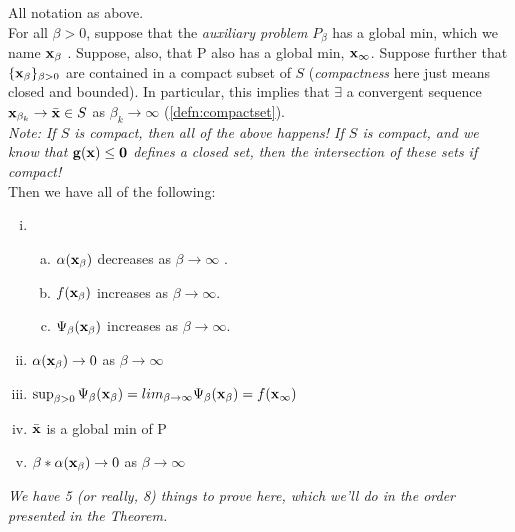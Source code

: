 \begin{theo}{}{}
	All notation as above. 
	\medskip\\
	For all $\beta > 0$, suppose that the \textit{auxiliary problem} $P_\beta$ 
	has a global min, which we name $\mathbf{x}_\beta$ . 
	Suppose, also, that
	P also has a global min, $\mathbf{x}_\infty$.
	Suppose further that $\{\mathbf{x}_\beta\}_{\beta > 0}$ are contained in a compact subset of
	$S$ (\textit{compactness} here just means closed and bounded).
	In particular, this implies that $\exists$ a convergent sequence 
	$\mathbf{x}_{\beta_k} \rightarrow \bar{\mathbf{x}} \in S$ as $\beta_k \rightarrow \infty$
	(\cref{defn:compactset}).
	\medskip\\
	\textit{Note: If $S$ is compact, then all of the above happens!
	If $S$ is compact, and we know that $\mathbf{g}(\mathbf{x}) \leq \mathbf{0}$ defines a closed set, then
the intersection of these sets if compact!}
	\bigskip\\
	Then we have all of the following:
	\begin{enumerate}[i)]
		\item
		\begin{enumerate}[a)]
			\item		
				$\alpha(\mathbf{x}_\beta)$ decreases as $\beta \rightarrow \infty$ .
			\item
				$f(\mathbf{x}_\beta)$ increases as  $\beta \rightarrow \infty$.
			\item
				$\Psi_\beta(\mathbf{x}_\beta)$ increases as $\beta \rightarrow \infty$.
	\end{enumerate}
\item
	 $\alpha(\mathbf{x}_\beta) \rightarrow 0$ as $\beta \rightarrow \infty$
 \item
	$\sup_{\beta > 0} \Psi_\beta(\mathbf{x}_\beta) = lim_{\beta \rightarrow \infty} \Psi_\beta(\mathbf{x}_\beta)
	= f(\mathbf{x}_\infty)$
\item
	$\bar{\mathbf{x}}$ is a global min of P
\item
	$\beta * \alpha(\mathbf{x}_\beta) \rightarrow 0$ as $\beta \rightarrow \infty$
	\end{enumerate}
\end{theo}

\textit{We have 5 (or really, 8) things to prove here, which we'll do in the order presented
in the Theorem.}

